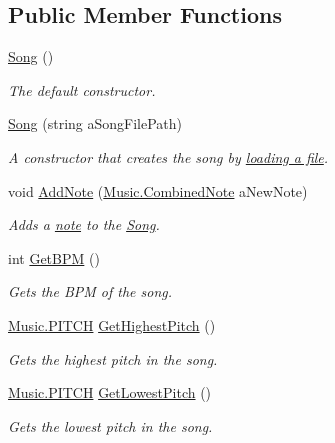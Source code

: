 \subsection*{Public Member Functions}
\begin{DoxyCompactItemize}
\item 
\hyperlink{group___song_construct_gae2e6486a6a2f523b7c81de472d761ff5}{Song} ()
\begin{DoxyCompactList}\small\item\em The default constructor. \end{DoxyCompactList}\item 
\hyperlink{group___song_construct_ga157b9e8a0ca714707c2bf58bed5ebf4c}{Song} (string a\+Song\+File\+Path)
\begin{DoxyCompactList}\small\item\em A constructor that creates the song by \hyperlink{group___song_priv_func_ga5c8edd8f7ebeab0d93f5619a644c30f5}{loading a file}. \end{DoxyCompactList}\item 
void \hyperlink{group___song_pub_func_gab7c8fe4dc29f5ae7b7728c583fe51f7e}{Add\+Note} (\hyperlink{group___music_structs_struct_music_1_1_combined_note}{Music.\+Combined\+Note} a\+New\+Note)
\begin{DoxyCompactList}\small\item\em Adds a \hyperlink{group___music_structs_struct_music_1_1_combined_note}{note} to the \hyperlink{class_song}{Song}. \end{DoxyCompactList}\item 
int \hyperlink{group___song_pub_func_gaaaf3d27d474713d7d368e3fd4c570be0}{Get\+B\+PM} ()
\begin{DoxyCompactList}\small\item\em Gets the B\+PM of the song. \end{DoxyCompactList}\item 
\hyperlink{group___music_enums_ga508f69b199ea518f935486c990edac1d}{Music.\+P\+I\+T\+CH} \hyperlink{group___song_pub_func_gafaa104e8653edf64148260ecd400570f}{Get\+Highest\+Pitch} ()
\begin{DoxyCompactList}\small\item\em Gets the highest pitch in the song. \end{DoxyCompactList}\item 
\hyperlink{group___music_enums_ga508f69b199ea518f935486c990edac1d}{Music.\+P\+I\+T\+CH} \hyperlink{group___song_pub_func_gae4e71c8eb059cc9cf0b77e78971ab326}{Get\+Lowest\+Pitch} ()
\begin{DoxyCompactList}\small\item\em Gets the lowest pitch in the song. \end{DoxyCompactList}\item 

\end{DoxyCompactItemize}
